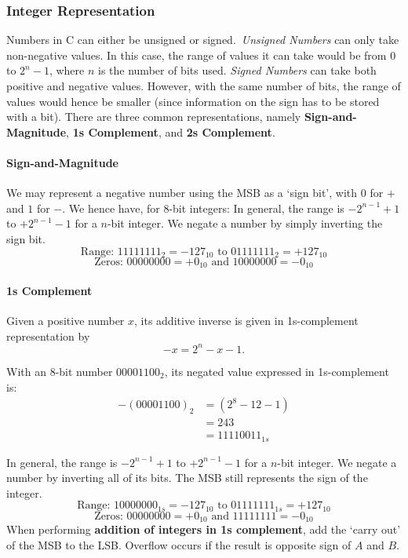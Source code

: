 \subsubsection{Integer Representation}
Numbers in C can either be unsigned or signed.\ \textit{Unsigned Numbers} can
only take non-negative values. In this case, the range of values it can take
would be from $0$ to $2^{n}-1$, where $n$ is the number of bits used.
\textit{Signed Numbers} can take both positive and negative values. However,
with the same number of bits, the range of values would hence be smaller (since
information on the sign has to be stored with a bit). There are three common
representations, namely \textbf{Sign-and-Magnitude}, \textbf{1s Complement},
and \textbf{2s Complement}. 

\paragraph{Sign-and-Magnitude}
We may represent a negative number using the MSB as a `sign bit', with $0$ for $+$ and
$1$ for $-$. We hence have, for $8$-bit integers:
In general, the range is $-2^{n-1}+1$ to $+2^{n-1}-1$ for a $n$-bit integer. We
negate a number by simply inverting the sign bit.
\[\text{Range: }11111111_2=-127_{10}\text{ to }01111111_2=+127_{10}\]
\[\text{Zeros: }00000000=+0_{10}\text{ and }10000000=-0_{10}\]

\paragraph{1s Complement}
Given a positive number $x$, its additive inverse is given in 1s-complement representation by
\[-x=2^{n}-x-1.\]
\begin{example}[$12_{10}$]
  With an $8$-bit number $00001100_2$, its negated value expressed in 1s-complement is:
  \begin{align*}
    -{\left( 00001100 \right)}_2&=(2^{8}-12-1)\\
                                &=243\\
                                &={11110011}_{1s}
  \end{align*}
\end{example}
In general, the range is $-2^{n-1}+1$ to $+2^{n-1}-1$ for a $n$-bit integer. We
negate a number by inverting all of its bits. The MSB still represents the sign
of the integer.
\[\text{Range: }10000000_{1s}=-127_{10}\text{ to }01111111_{1s}=+127_{10}\]
\[\text{Zeros: }00000000=+0_{10}\text{ and }11111111=-0_{10}\]
When performing \textbf{addition of integers in 1s complement}, add the `carry out' of
the MSB to the LSB\@. Overflow occurs if the result is opposite sign of $A$ and
$B$.

